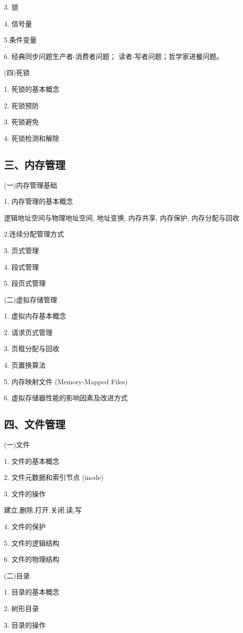 \documentclass[10pt]{article}
\begin{document}
3. 锁

4. 信号量 

5.条件变量 

6. 经典同步问题生产者-消费者问题；{\color{red} 读者-写者问题；哲学家进餐问题}。

(四)死锁

1. 死锁的基本概念

2. 死锁预防

3. 死锁避免

4. 死锁检测和解除

\subsection*{三、内存管理}

(一)内存管理基础

1. 内存管理的基本概念

逻辑地址空间与物理地址空间, 地址变换, 内存共享, 内存保护, 内存分配与回收

2.连续分配管理方式

3. 页式管理

4. 段式管理

5. 段页式管理

(二)虚拟存储管理

1. 虚拟内存基本概念

2. 请求页式管理

3. 页框分配与回收

4. 页置换算法

5. 内存映射文件 (Memory-Mapped Files)

6. 虚拟存储器性能的影响因素及改进方式

\subsection*{四、文件管理}

(一)文件

1. 文件的基本概念

2. 文件元数据和索引节点 (inode)

3. 文件的操作

建立,删除,打开,关闭,读,写

4. 文件的保护

5. 文件的逻辑结构

6. 文件的物理结构

(二)目录

1. 目录的基本概念

2. 树形目录

3. 目录的操作
\end{document}
